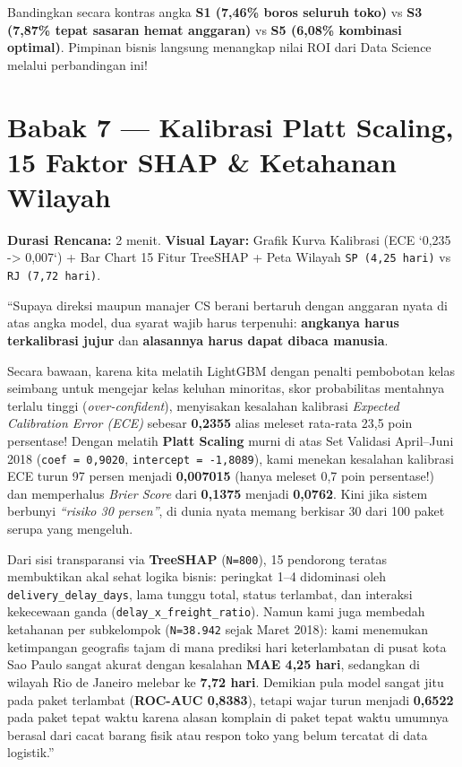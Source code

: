 \documentclass[11pt,a4paper,oneside]{book}
\newcommand{\code}[1]{{\small\nolinkurl{#1}}}
\begin{document}
\begin{tipbox}
Bandingkan secara kontras angka \textbf{S1 (7,46\% boros seluruh toko)} vs \textbf{S3 (7,87\% tepat sasaran hemat anggaran)} vs \textbf{S5 (6,08\% kombinasi optimal)}. Pimpinan bisnis langsung menangkap nilai ROI dari Data Science melalui perbandingan ini!
\end{tipbox}

\section{Babak 7 --- Kalibrasi Platt Scaling, 15 Faktor SHAP \& Ketahanan Wilayah}

\begin{stagebox}
\textbf{Durasi Rencana:} 2 menit. \quad \textbf{Visual Layar:} Grafik Kurva Kalibrasi (ECE `0,235 -> 0,007`) + Bar Chart 15 Fitur TreeSHAP + Peta Wilayah \code{SP (4,25 hari)} vs \code{RJ (7,72 hari)}.
\end{stagebox}

\begin{scriptbox}
``Supaya direksi maupun manajer CS berani bertaruh dengan anggaran nyata di atas angka model, dua syarat wajib harus terpenuhi: \textbf{angkanya harus terkalibrasi jujur} dan \textbf{alasannya harus dapat dibaca manusia}.

Secara bawaan, karena kita melatih LightGBM dengan penalti pembobotan kelas seimbang untuk mengejar kelas keluhan minoritas, skor probabilitas mentahnya terlalu tinggi (\emph{over-confident}), menyisakan kesalahan kalibrasi \emph{Expected Calibration Error (ECE)} sebesar \textbf{0,2355} alias meleset rata-rata 23,5 poin persentase! Dengan melatih \textbf{Platt Scaling} murni di atas Set Validasi April--Juni 2018 (\code{coef = 0,9020}, \code{intercept = -1,8089}), kami menekan kesalahan kalibrasi ECE turun 97 persen menjadi \textbf{0,007015} (hanya meleset 0,7 poin persentase!) dan memperhalus \emph{Brier Score} dari \textbf{0,1375} menjadi \textbf{0,0762}. Kini jika sistem berbunyi \emph{``risiko 30 persen''}, di dunia nyata memang berkisar 30 dari 100 paket serupa yang mengeluh.

Dari sisi transparansi via \textbf{TreeSHAP} (\code{N=800}), 15 pendorong teratas membuktikan akal sehat logika bisnis: peringkat 1--4 didominasi oleh \code{delivery_delay_days}, lama tunggu total, status terlambat, dan interaksi kekecewaan ganda (\code{delay_x_freight_ratio}). Namun kami juga membedah ketahanan per subkelompok (\code{N=38.942} sejak Maret 2018): kami menemukan ketimpangan geografis tajam di mana prediksi hari keterlambatan di pusat kota Sao Paulo sangat akurat dengan kesalahan \textbf{MAE 4,25 hari}, sedangkan di wilayah Rio de Janeiro melebar ke \textbf{7,72 hari}. Demikian pula model sangat jitu pada paket terlambat (\textbf{ROC-AUC 0,8383}), tetapi wajar turun menjadi \textbf{0,6522} pada paket tepat waktu karena alasan komplain di paket tepat waktu umumnya berasal dari cacat barang fisik atau respon toko yang belum tercatat di data logistik.''
\end{scriptbox}
\end{document}
